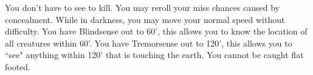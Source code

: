 {You don't have to see to kill.}
{You may reroll your miss chances caused by concealment.}
{While in darkness, you may move your normal speed without difficulty.}
{You have Blindsense out to 60', this allows you to know the location of all creatures within 60'.}
{You have Tremorsense out to 120', this allows you to ``see" anything within 120' that is touching the earth.}
{You cannot be caught flat footed.}